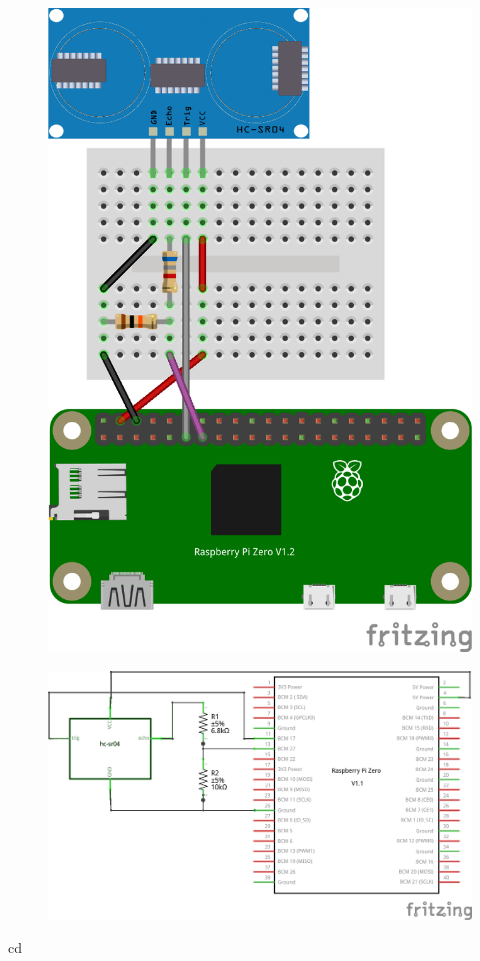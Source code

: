 

\begin{figure}[ht]
  \centering
  \includegraphics[scale=0.25, angle=-90]{images/HC-SR04_Steckplatine.png}	
  \label{DHT22_Steckplatine}
\end{figure}


\begin{figure}[ht]
	\centering
	\includegraphics[scale=0.25]{images/HC-SR04_Schaltplan.png}	
	\label{DHT22_Steckplatine}
\end{figure}



\begin{console}
cd ~
\end{console}